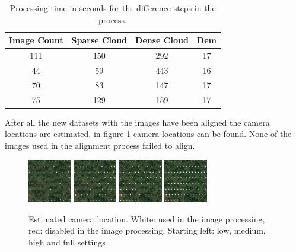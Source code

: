 \documentclass{isprs} %
\begin{document}
\begin{table}[h]
    \centering
    \caption{Processing time in seconds for the difference steps in the process.}
    \label{tab:processingTime}
    \begin{tabular}{@{}cccc@{}}
    \toprule
    \textbf{Image Count} & \textbf{Sparse  Cloud} & \textbf{Dense Cloud} & \textbf{Dem} \\ \midrule
    111                  & 150                    & 292                  & 17           \\
    44                   & 59                     & 443                  & 16           \\
    70                   & 83                     & 147                  & 17           \\
    75                   & 129                    & 159                  & 17           \\ \bottomrule
    \end{tabular}
\end{table}

After all the new datasets with the images have been aligned the camera locations are estimated, in figure \ref{fig:cameralocation} camera locations can be found. 
None of the images used in the alignment process failed to align.


\begin{figure}[h]
    \centering
    \includegraphics[width=1.9cm]{loc_low.png}
    \includegraphics[width=1.9cm]{loc_med.png}
    \includegraphics[width=1.9cm]{loc_high.png}
    \includegraphics[width=1.9cm]{loc_full.png}
    \caption{Estimated camera location. 
    White: used in the image processing, red: disabled in the image processing.
    Starting left: low, medium, high and full settings}
    \label{fig:cameralocation}
\end{figure}
\end{document}
